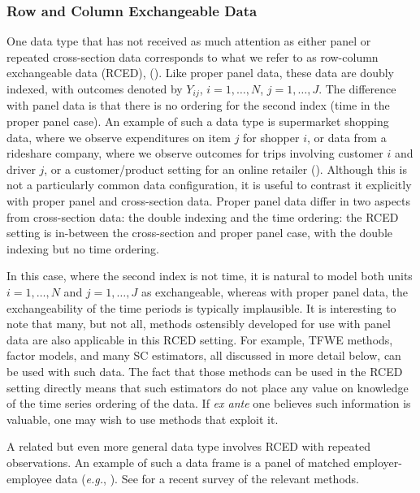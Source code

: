 \documentclass[letterpaper,12pt,leqno]{article}
\begin{document}
\subsubsection{Row and Column Exchangeable Data}\label{twdf}

One data type that has not received as much attention as either panel or repeated cross-section data corresponds to what we refer to as row-column exchangeable data (RCED), 
(\citep{aldous1981representations, lynch1984canonical}).  Like proper panel data, these data are doubly indexed, with outcomes denoted by $Y_{ij}$, $i=1,\ldots,N$, $j=1,\ldots,J$. The difference with panel data is that there is no ordering for the second index (time in the proper panel case). An example of such a data type is supermarket shopping data, where we observe expenditures on item $j$ for shopper $i$, or data from a rideshare company, where we observe outcomes for trips involving customer $i$ and driver $j$, or a customer/product setting for an online retailer (\citealp{abadie2024doubly}). Although this is not a particularly common data configuration, it is useful to contrast  it explicitly with proper panel  and cross-section data.  Proper panel data differ in two aspects from cross-section data: the double indexing and the time ordering: the RCED setting is in-between the cross-section and proper panel case, with the double indexing but no time ordering.

In this case, where the second index is not time, it is natural to model both units $i=1,\ldots,N$ and $j=1,\ldots,J$ as exchangeable, whereas with proper panel data, the exchangeability of the time periods is typically implausible. It is interesting to note that 
many,  but not all, methods ostensibly developed for use with panel data are also applicable in this RCED setting. For example, TFWE methods, factor models, and many SC estimators, all discussed in more detail below, can be used with such data. The fact that those methods can be used in the RCED setting directly means that such estimators do not place any value on knowledge of the time series ordering of the data. If {\it ex ante} one believes such information is valuable, one may wish to use methods that exploit it.

A related but even more general data type involves RCED with repeated observations. An example of such a data frame is a panel of matched employer-employee data (\textit{e.g.}, \citealp{abowd1999high, card2022industry}). See \citep{bonhomme2020econometric} for a recent survey of the relevant methods.
\end{document}
